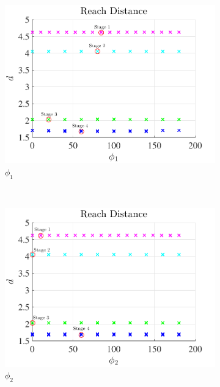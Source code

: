 \begin{figure}[htbp] 
    \centering 
    \begin{subfigure}[htbp]{0.3\textwidth} 
        \includegraphics[width=\textwidth]{figures/2016_AAS/phi1.pdf} 
        \caption{ \( \phi_1 \)} \label{fig:phi1} 
    \end{subfigure}~
    \begin{subfigure}[htbp]{0.3\textwidth} 
        \includegraphics[width=\textwidth]{figures/2016_AAS/phi2.pdf} 
        \caption{\( \phi_2 \)} \label{fig:phi2} 
    \end{subfigure}~
    \begin{subfigure}[htbp]{0.3\textwidth} 

\end{subfigure}
\end{figure}
